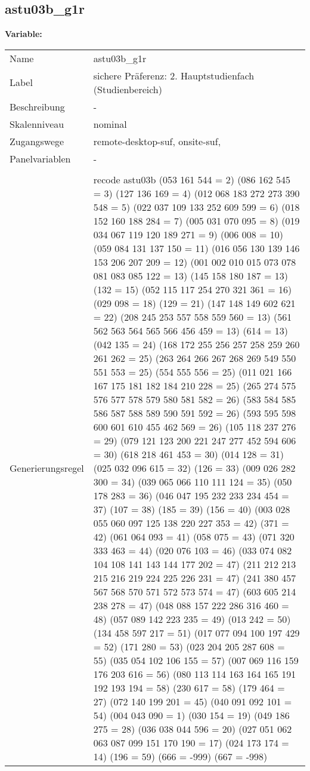 	
	
	\subsection{astu03b\_g1r}
	\label{subSection:astu03b_g1r}

	\noindent\textbf{Variable:}\\
		\begin{tabular}{lL{11.3cm}}
			\label{tableVariable:astu03b_g1r}
			Name & astu03b\_g1r \\
			Label & sichere Präferenz: 2. Hauptstudienfach  (Studienbereich) \\
			Beschreibung & - \\
			Skalenniveau & nominal \\
			Zugangswege &
				remote-desktop-suf,
				onsite-suf,
 \\
			Panelvariablen & -
			 \\
			 \\
					Generierungsregel & recode astu03b (053 161 544 = 2)  (086 162 545 = 3) (127 136 169 = 4) (012 068 183 272 273 390 548 = 5) (022 037 109 133 252 609 599 = 6) (018 152 160 188 284 = 7) (005 031 070 095 = 8) (019 034 067 119 120 189 271 = 9) (006 008 = 10) (059 084 131 137 150 = 11) (016 056 130 139 146 153 206 207 209   = 12) (001 002 010 015 073 078 081 083 085 122  = 13) (145 158 180 187 = 13) (132 = 15) (052 115 117 254 270 321 361 = 16) (029 098 = 18) (129 = 21) (147 148 149 602 621 = 22) (208 245 253 557 558 559 560 = 13) (561 562 563 564 565 566 456 459 = 13) (614 = 13) (042 135 = 24) (168 172 255 256 257 258 259 260 261 262  = 25) (263 264 266 267 268 269 549 550 551 553  = 25) (554 555 556 = 25) (011 021 166 167 175 181 182 184 210 228 = 25) (265 274 575 576 577 578 579 580 581 582 = 26) (583 584 585 586 587 588 589 590 591 592  = 26) (593 595 598 600 601 610 455 462 569 = 26) (105 118 237 276 = 29) (079 121 123 200 221 247 277 452 594 606 = 30) (618 218 461 453 = 30)  (014 128 = 31) (025 032 096 615 = 32) (126 = 33) (009 026 282 300 = 34) (039 065 066 110 111 124 = 35) (050 178 283 = 36) (046 047 195 232 233 234 454 = 37) (107 = 38)    (185 = 39) (156 = 40) (003 028 055 060 097 125 138 220 227 353 = 42)  (371 = 42)  (061 064 093 = 41) (058 075 = 43) (071 320 333 463 = 44)  (020 076 103 = 46) (033 074 082 104 108 141 143 144 177 202  = 47) (211 212 213 215 216 219 224 225 226 231  = 47) (241 380 457 567 568 570 571 572 573 574 = 47) (603 605 214 238 278 = 47) (048 088 157 222 286 316 460 = 48) (057 089 142 223 235 = 49) (013 242 = 50) (134 458 597 217 = 51) (017 077 094 100 197 429 = 52) (171 280 = 53) (023 204 205 287 608 = 55) (035 054 102 106 155 = 57) (007 069 116 159 176 203 616 = 56) (080 113 114 163 164 165 191 192 193 194  = 58) (230 617 = 58) (179 464 = 27) (072 140 199 201 = 45) (040 091 092 101 = 54) (004 043 090 = 1) (030 154 = 19) (049 186 275 = 28) (036 038 044 596 = 20) (027 051 062 063 087 099 151 170 190 = 17) (024 173 174 = 14) (196 = 59) (666 = -999) (667 = -998) 

\end{tabular}
